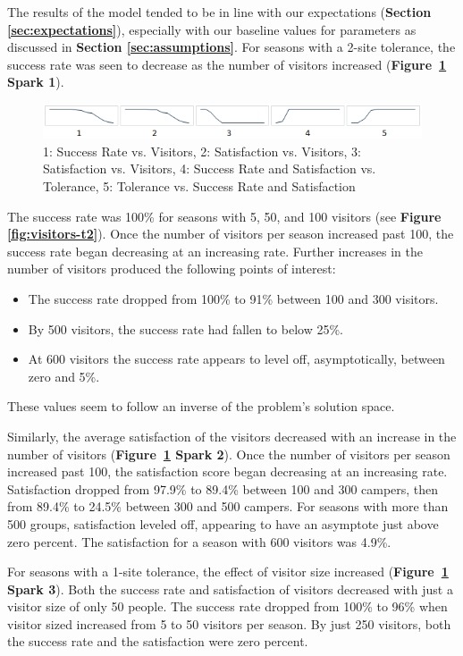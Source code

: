 \documentclass[11pt]{article} %
\begin{document}
The results of the model tended to be in line with our
expectations (\textbf{Section \ref{sec:expectations}}), especially with
our baseline values for parameters as discussed in
\textbf{Section \ref{sec:assumptions}}.
For seasons with a 2-site tolerance, the success rate
was seen to decrease as the number of visitors increased
(\textbf{Figure~\ref{fig:sparklines} Spark 1}).

\begin{figure}[b]
  \centering
  \includegraphics[scale=.9]{imgs/sparklines.png}
  \caption{1: Success Rate vs. Visitors, 2: Satisfaction
    vs. Visitors, 3: Satisfaction vs. Visitors,
    4: Success Rate and Satisfaction vs. Tolerance, 5: Tolerance vs. Success Rate and Satisfaction}
  \label{fig:sparklines}
\end{figure}

The success rate was 100\% for seasons with 5, 50, and 100
visitors (see \textbf{Figure \ref{fig:visitors-t2}}).
Once the number of visitors per season increased past 100, the
success rate began decreasing at an increasing rate.
Further increases in the number of visitors produced the following points
of interest:
\begin{itemize}
\item The success rate dropped from 100\% to 91\% between 100 and 300 visitors.
\item By 500 visitors, the success rate had fallen to below 25\%.
\item At 600 visitors the success rate appears to level off, asymptotically,
between zero and 5\%.
\end{itemize}
These values seem to follow an inverse of the problem's solution space.

Similarly, the average satisfaction of the visitors decreased with an increase in the
number of visitors (\textbf{Figure~\ref{fig:sparklines} Spark 2}).
Once the number of visitors per season increased past 100, the
satisfaction score began decreasing at an increasing rate. Satisfaction dropped
from 97.9\% to 89.4\% between 100 and 300 campers, then from 89.4\%
to 24.5\% between 300 and 500 campers. For seasons with more
than 500 groups, satisfaction leveled off, appearing to have an
asymptote just above zero percent. The satisfaction for a season with 600 visitors
was 4.9\%.

For seasons with a  1-site tolerance, the effect of visitor size increased
(\textbf{Figure~\ref{fig:sparklines} Spark 3}). Both the
success rate and satisfaction of visitors decreased with just a visitor size of
only 50 people. The success rate dropped from 100\% to 96\%
when visitor sized increased from 5 to 50 visitors per season. By just 250
visitors, both the success rate and the satisfaction were zero percent.
\end{document}
